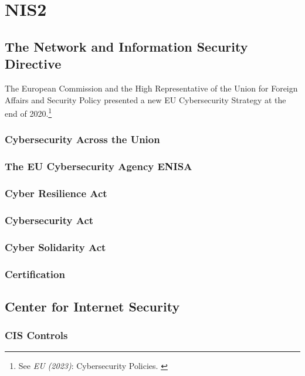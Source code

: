 %
%

\pagebreak
\section{NIS2}

\onehalfspacing

\subsection{The Network and Information Security Directive}

The European Commission and the High Representative of the Union for Foreign Affairs and Security Policy presented a new EU Cybersecurity Strategy at the end of 2020.\footnote{See \textit{EU (2023)}: Cybersecurity Policies. \cite{cyberPol}}

\subsubsection{Cybersecurity Across the Union}

\subsubsection{The EU Cybersecurity Agency ENISA}

\subsubsection{Cyber Resilience Act}

\subsubsection{Cybersecurity Act}

\subsubsection{Cyber Solidarity Act}

\subsubsection{Certification}

\subsection{Center for Internet Security}

\subsubsection{CIS Controls}

